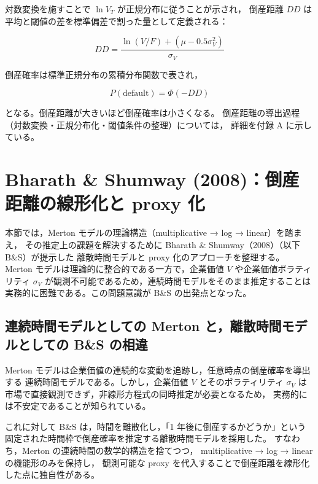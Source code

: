 対数変換を施すことで $\ln V_T$ が正規分布に従うことが示され，
倒産距離 $DD$ は平均と閾値の差を標準偏差で割った量として定義される：



\[
DD = \frac{\ln(V/F) + (\mu - 0.5\sigma_V^2)}{\sigma_V}
\]



倒産確率は標準正規分布の累積分布関数で表され，



\[
P(\text{default}) = \Phi(-DD)
\]



となる。倒産距離が大きいほど倒産確率は小さくなる。
倒産距離の導出過程（対数変換・正規分布化・閾値条件の整理）については，
詳細を付録 A に示している。

\section{Bharath \& Shumway (2008)：倒産距離の線形化と proxy 化}

本節では，Merton モデルの理論構造（multiplicative → log → linear）を踏まえ，
その推定上の課題を解決するために Bharath \& Shumway（2008）（以下 B\&S）が提示した
離散時間モデルと proxy 化のアプローチを整理する。
Merton モデルは理論的に整合的である一方で，企業価値 $V$ や企業価値ボラティリティ
$\sigma_V$ が観測不可能であるため，連続時間モデルをそのまま推定することは
実務的に困難である。この問題意識が B\&S の出発点となった。

\subsection{連続時間モデルとしての Merton と，離散時間モデルとしての B\&S の相違}

Merton モデルは企業価値の連続的な変動を追跡し，任意時点の倒産確率を導出する
連続時間モデルである。しかし，企業価値 $V$ とそのボラティリティ $\sigma_V$ は
市場で直接観測できず，非線形方程式の同時推定が必要となるため，
実務的には不安定であることが知られている。

これに対して B\&S は，時間を離散化し，「1 年後に倒産するかどうか」という
固定された時間枠で倒産確率を推定する離散時間モデルを採用した。
すなわち，Merton の連続時間の数学的構造を捨てつつ，
multiplicative → log → linear の機能形のみを保持し，
観測可能な proxy を代入することで倒産距離を線形化した点に独自性がある。

